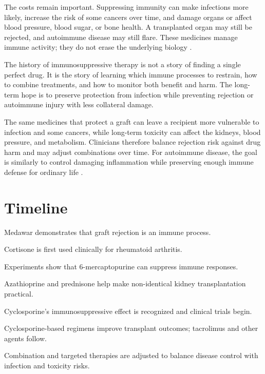 \documentclass[12pt,oneside]{book}
\begin{document}
The costs remain important. Suppressing immunity can make infections more
likely, increase the risk of some cancers over time, and damage organs or
affect blood pressure, blood sugar, or bone health. A transplanted organ may
still be rejected, and autoimmune disease may still flare. These medicines
manage immune activity; they do not erase the underlying biology
\cite{niddkKidneyTransplant,niamsLupus}.

The history of immunosuppressive therapy is not a story of finding a single
perfect drug. It is the story of learning which immune processes to restrain,
how to combine treatments, and how to monitor both benefit and harm. The
long-term hope is to preserve protection from infection while preventing
rejection or autoimmune injury with less collateral damage.

The same medicines that protect a graft can leave a recipient more vulnerable
to infection and some cancers, while long-term toxicity can affect the
kidneys, blood pressure, and metabolism. Clinicians therefore balance
rejection risk against drug harm and may adjust combinations over time. For
autoimmune disease, the goal is similarly to control damaging inflammation
while preserving enough immune defense for ordinary life
\cite{ishltMaintenanceImmunosuppression,niamsLupus}.

\section*{Timeline}
\begin{description}[leftmargin=2.3cm,style=nextline]
  \item[1944] Medawar demonstrates that graft rejection is an immune process.
  \item[1948] Cortisone is first used clinically for rheumatoid arthritis.
  \item[1959] Experiments show that 6-mercaptopurine can suppress immune responses.
  \item[1962--1963] Azathioprine and prednisone help make non-identical kidney transplantation practical.
  \item[1976--1979] Cyclosporine's immunosuppressive effect is recognized and clinical trials begin.
  \item[1980s] Cyclosporine-based regimens improve transplant outcomes; tacrolimus and other agents follow.
  \item[Today] Combination and targeted therapies are adjusted to balance disease control with infection and toxicity risks.
\end{description}
\end{document}
